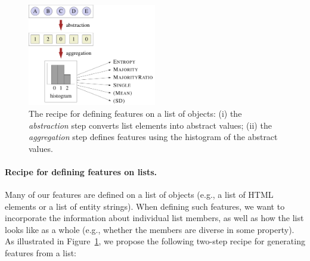 \begin{figure}
\centering
\includegraphics[width=0.5\textwidth]{sfig/openweb.slides/extractionFeatureRecipe.pdf}
\caption[
The recipe for defining features on a list of objects.
]{
The recipe for defining features on a list of objects:
(i) the \emph{abstraction} step converts list elements into abstract values;
(ii) the \emph{aggregation} step defines features using the histogram of the abstract values.}
\label{fig:openweb-recipe}
\end{figure}

\paragraph{Recipe for defining features on lists.}
Many of our features are defined on a list of objects
(e.g., a list of HTML elements or a list of entity strings).
When defining such features,
we want to incorporate the information about
individual list members,
as well as how the list looks like as a whole
(e.g., whether the members are diverse in some property).
As illustrated in Figure~\ref{fig:openweb-recipe},
we propose the following two-step recipe for generating
features from a list:

